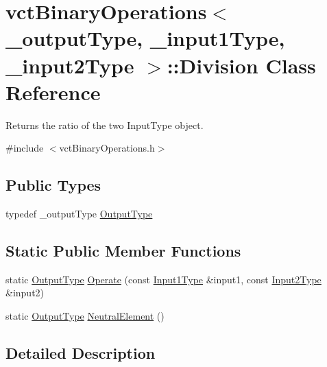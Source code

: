 \hypertarget{classvct_binary_operations_1_1_division}{\section{vct\-Binary\-Operations$<$ \-\_\-output\-Type, \-\_\-input1\-Type, \-\_\-input2\-Type $>$\-:\-:Division Class Reference}
\label{classvct_binary_operations_1_1_division}
}


Returns the ratio of the two Input\-Type object.  




{\ttfamily \#include $<$vct\-Binary\-Operations.\-h$>$}

\subsection*{Public Types}
\begin{DoxyCompactItemize}
\item 
typedef \-\_\-output\-Type \hyperlink{classvct_binary_operations_1_1_division_a3e7c6d995453d18ae82265141ae1dff0}{Output\-Type}
\end{DoxyCompactItemize}
\subsection*{Static Public Member Functions}
\begin{DoxyCompactItemize}
\item 
static \hyperlink{classvct_binary_operations_1_1_division_a3e7c6d995453d18ae82265141ae1dff0}{Output\-Type} \hyperlink{classvct_binary_operations_1_1_division_acdd4e08ee584dea4dc0db6da4540b1cc}{Operate} (const \hyperlink{classvct_binary_operations_a5e56a66a012d6a28c539a08a0021c45e}{Input1\-Type} \&input1, const \hyperlink{classvct_binary_operations_a929119af557a04a16b4d854981e49e1b}{Input2\-Type} \&input2)
\item 
static \hyperlink{classvct_binary_operations_1_1_division_a3e7c6d995453d18ae82265141ae1dff0}{Output\-Type} \hyperlink{classvct_binary_operations_1_1_division_a3dbdf848ff9f642f93f5d0b7fd18fa0d}{Neutral\-Element} ()
\end{DoxyCompactItemize}


\subsection{Detailed Description}
